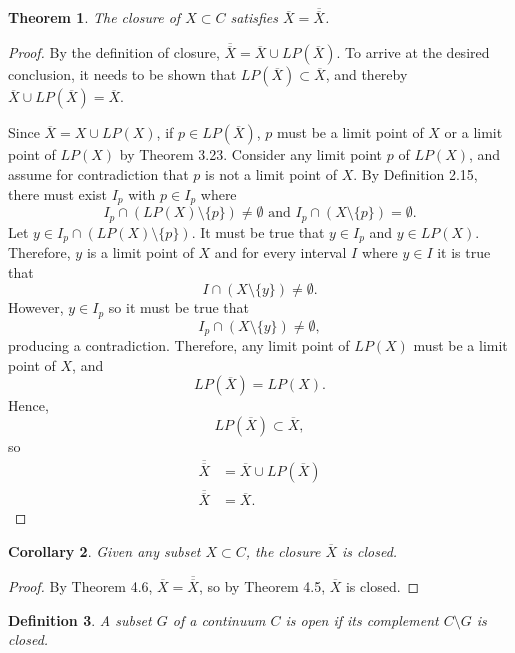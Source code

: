 \documentclass{amsart}
\newtheorem{theorem}{Theorem}
\newtheorem{definition}[theorem]{Definition}
\newtheorem{corollary}[theorem]{Corollary}
\newcommand{\1}{\mathds{1}}
\numberwithin{equation}{section}
\numberwithin{theorem}{section}
\begin{document}
\begin{theorem}  The closure of $X \subset C$ satisfies $\overline{X} = \overline{\overline{X}}$.
\end{theorem}

\begin{proof}
	By the definition of closure, $\overline{\overline{X}} = \overline{X} \cup LP(\overline{X})$. To arrive at the desired conclusion, it needs to be shown that $LP(\overline{X})\subset \overline{X}$, and thereby $\overline{X} \cup LP(\overline{X}) = \overline{X}$. 
	
	Since $\overline{X} = X \cup LP(X)$, if $p\in LP(\overline{X})$, $p$ must be a limit point of $X$ or a limit point of $LP(X)$ by Theorem 3.23. Consider any limit point $p$ of $LP(X)$, and assume for contradiction that $p$ is not a limit point of $X$. By Definition 2.15, there must exist $I_p$ with $p\in I_p$ where $$I_p \cap (LP(X)\setminus \{p\}) \not= \emptyset \text{ and } I_p \cap (X\setminus \{p\}) = \emptyset.$$ Let $y\in I_p \cap (LP(X)\setminus \{p\})$. It must be true that $y\in I_p$ and $y\in LP(X)$. Therefore, $y$ is a limit point of $X$ and for every interval $I$ where $y\in I$ it is true that $$I \cap (X\setminus \{y\}) \not= \emptyset.$$ However, $y\in I_p$ so it must be true that $$I_p \cap (X\setminus \{y\}) \not= \emptyset,$$ producing a contradiction. Therefore, any limit point of $LP(X)$ must be a limit point of $X$, and $$LP(\overline{X}) = LP(X).$$ Hence, $$LP(\overline{X})\subset \overline{X},$$ so 
	\[\begin{split}
		\overline{\overline{X}} &= \overline{X} \cup LP(\overline{X})\\
		\overline{\overline{X}} &= \overline{X}.
	\end{split}\]
\end{proof}

\begin{corollary}  Given any subset $X \subset C$, the closure $\overline{X}$ is closed.
\end{corollary}

\begin{proof}
	By Theorem 4.6, $\overline{X} = \overline{\overline{X}}$, so by Theorem 4.5, $\overline{X}$ is closed.
\end{proof}

\begin{definition}  A subset $G$ of a continuum $C$ is \emph{open} if its complement $C \setminus G$ is closed.
\end{definition}
\end{document}
